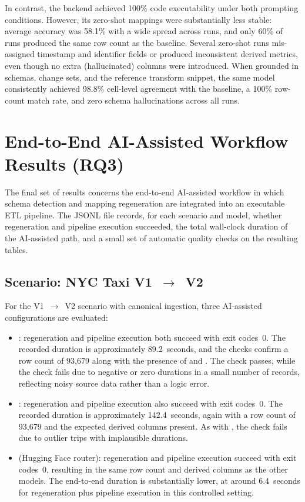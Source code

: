 In contrast, the  backend achieved 100\% code executability under
both prompting conditions. However, its zero-shot mappings were substantially less stable: average
accuracy was 58.1\% with a wide spread across runs, and only 60\% of runs produced the same row
count as the baseline. Several zero-shot runs mis-assigned timestamp and identifier fields or
produced inconsistent derived metrics, even though no extra (hallucinated) columns were introduced.
When grounded in schemas, change sets, and the reference transform snippet, the same model
consistently achieved 98.8\% cell-level agreement with the baseline, a 100\% row-count match rate,
and zero schema hallucinations across all runs.


\section{End-to-End AI-Assisted Workflow Results (RQ3)}
\label{sec:results-e2e}

The final set of results concerns the end-to-end AI-assisted workflow in which schema detection and mapping regeneration are integrated into an executable ETL pipeline. The JSONL file  records, for each scenario and model, whether regeneration and pipeline execution succeeded, the total wall-clock duration of the AI-assisted path, and a small set of automatic quality checks on the resulting tables.

\subsection{Scenario: NYC Taxi V1~\texorpdfstring{$\rightarrow$}{->}~V2}

For the V1~$\rightarrow$~V2 scenario with canonical ingestion, three AI-assisted configurations are evaluated:
%
\begin{itemize}
  \item \textbf{}: regeneration and pipeline execution both succeed with exit codes~0. The recorded duration is approximately 89.2~seconds, and the checks confirm a row count of 93{,}679 along with the presence of  and . The  check passes, while the  check fails due to negative or zero durations in a small number of records, reflecting noisy source data rather than a logic error.
  \item \textbf{}: regeneration and pipeline execution also succeed with exit codes~0. The recorded duration is approximately 142.4~seconds, again with a row count of 93{,}679 and the expected derived columns present. As with , the  check fails due to outlier trips with implausible durations.
  \item \textbf{} (Hugging Face router): regeneration and pipeline execution succeed with exit codes~0, resulting in the same row count and derived columns as the other models. The end-to-end duration is substantially lower, at around 6.4~seconds for regeneration plus pipeline execution in this controlled setting.
\end{itemize}


